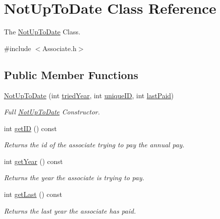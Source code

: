 \hypertarget{classNotUpToDate}{}\section{Not\+Up\+To\+Date Class Reference}
\label{classNotUpToDate}


The \mbox{\hyperlink{classNotUpToDate}{Not\+Up\+To\+Date}} Class.  




{\ttfamily \#include $<$Associate.\+h$>$}

\subsection*{Public Member Functions}
\begin{DoxyCompactItemize}
\item 
\mbox{\hyperlink{classNotUpToDate_a61d903e6816ad8d5f5b496a72047df45}{Not\+Up\+To\+Date}} (int \mbox{\hyperlink{classNotUpToDate_a5e44159542e23d8ad12aba8768bd3350}{tried\+Year}}, int \mbox{\hyperlink{classNotUpToDate_afa612d29a846c1e7b679fbb069035a72}{unique\+ID}}, int \mbox{\hyperlink{classNotUpToDate_a728feda5151336575cd80a9b52a7a7d3}{last\+Paid}})
\begin{DoxyCompactList}\small\item\em Full \mbox{\hyperlink{classNotUpToDate}{Not\+Up\+To\+Date}} Constructor. \end{DoxyCompactList}\item 
int \mbox{\hyperlink{classNotUpToDate_aa0ee44392c77d24e7bb7a2096a940f0e}{get\+ID}} () const
\begin{DoxyCompactList}\small\item\em Returns the id of the associate trying to pay the annual pay. \end{DoxyCompactList}\item 
int \mbox{\hyperlink{classNotUpToDate_aab8122c1a325a895df70ebf25cf1918d}{get\+Year}} () const
\begin{DoxyCompactList}\small\item\em Returns the year the associate is trying to pay. \end{DoxyCompactList}\item 
int \mbox{\hyperlink{classNotUpToDate_a5aaa486e2e8cd13688e57d4e58096cab}{get\+Last}} () const
\begin{DoxyCompactList}\small\item\em Returns the last year the associate has paid. \end{DoxyCompactList}\end{DoxyCompactItemize}
